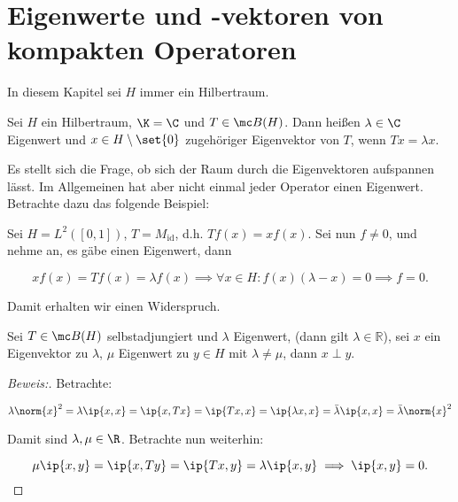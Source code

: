 \section{Eigenwerte und -vektoren von kompakten Operatoren}

In diesem Kapitel sei $H$ immer ein Hilbertraum.


\begin{definition}
	
	Sei $H$ ein Hilbertraum, $\K = \C$ und $T \in \mc B(H)$. Dann heißen $\lambda \in \C$ Eigenwert und $x \in H \setminus \set{0}$ zugehöriger Eigenvektor von $T$, wenn $Tx = \lambda x$.
	
\end{definition}


\begin{rem}
	
	Es stellt sich die Frage, ob sich der Raum durch die Eigenvektoren aufspannen lässt. Im Allgemeinen hat aber nicht einmal jeder Operator einen Eigenwert. Betrachte dazu das folgende Beispiel:
	
\end{rem}


\begin{ex}
	
	Sei $H = L^2([0, 1])$, $T = M_{\text{id}}$, d.h. $Tf(x) = xf(x)$. Sei nun $f \not= 0$, und nehme an, es gäbe einen Eigenwert, dann
	
	\[ xf(x) = Tf(x) = \lambda f(x) \implies \forall x \in H: f(x)(\lambda - x) = 0 \implies f = 0. \]
	
	Damit erhalten wir einen Widerspruch.
	
\end{ex}


\begin{theorem}
	\label{real_ev}
	Sei $T \in \mc B(H)$ selbstadjungiert und $\lambda$ Eigenwert, (dann gilt $\lambda \in \mathbb{R}$), sei $x$ ein Eigenvektor zu $\lambda$, $\mu$ Eigenwert zu $y \in H$ mit $\lambda \not= \mu$, dann $x \perp y$.
	
	\begin{proof}[Beweis:]
		
		Betrachte:
		
		\[ \lambda \norm{x}^2 =\lambda \ip{x, x} = \ip{x, Tx} = \ip{Tx, x} = \ip{\lambda x, x} = \bar\lambda \ip{x, x} = \bar\lambda \norm{x}^2 \]
		
		
		Damit sind $\lambda, \mu \in \R$. Betrachte nun weiterhin:
		
		\[ \mu \ip{x, y} = \ip{x, Ty} = \ip{Tx, y} = \lambda \ip{x, y} \implies \ip{x, y} = 0. \]
		
	\end{proof}
	
\end{theorem}



